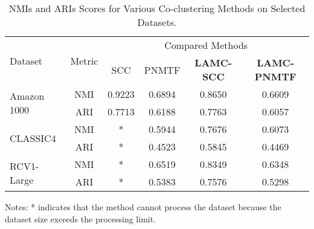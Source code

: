 \begin{table*}[htbp]
    \centering
    \caption{NMIs and ARIs Scores for Various Co-clustering Methods on Selected Datasets.}
    \label{tab:evaluation-metrics}
    \begin{tabular}{@{} l c cccc @{}}
        \toprule
        \multirow{2}{*}{Dataset}     & \multirow{2}{*}{Metric} & \multicolumn{4}{c}{Compared Methods}                                                                                                        \\
        \cmidrule{3-6}
                                     &                         & SCC \cite{dhillon2001CoclusteringDocumentsWords} & PNMTF \cite{chen2023ParallelNonNegativeMatrix} & \textbf{LAMC-SCC} & \textbf{LAMC-PNMTF} \\
        \midrule
        \multirow{2}{*}{Amazon 1000} & NMI                     & 0.9223                                           & 0.6894                                         & 0.8650            & 0.6609              \\
                                     & ARI                     & 0.7713                                           & 0.6188                                         & 0.7763            & 0.6057              \\
        \multirow{2}{*}{CLASSIC4}    & NMI                     & *                                                & 0.5944                                         & 0.7676            & 0.6073              \\
                                     & ARI                     & *                                                & 0.4523                                         & 0.5845            & 0.4469              \\
        \multirow{2}{*}{RCV1-Large}  & NMI                     & *                                                & 0.6519                                         & 0.8349            & 0.6348              \\
                                     & ARI                     & *                                                & 0.5383                                         & 0.7576            & 0.5298              \\
        \bottomrule
    \end{tabular}
    \begin{tablenotes}
        \small
        \item Notes: * indicates that the method cannot process the dataset because the dataset size exceeds the processing limit.
    \end{tablenotes}
\end{table*}

